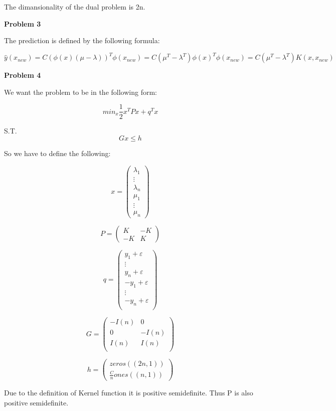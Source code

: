 \documentclass[12pt]{article}
\begin{document}
	The dimansionality of the dual problem is 2n.
	
	\textbf{Problem 3}
	
	\medskip
	
	The prediction is defined by the following formula:
	
	$$\hat{y}(x_{new}) = C(\phi(x)(\mu - \lambda))^T\phi(x_{new}) = C (\mu^T - \lambda^T)\phi(x)^T \phi(x_{new}) = C (\mu^T - \lambda^T) K(x, x_{new})$$
		
	\textbf{Problem 4}
	
	\medskip
	
	We want the problem to be in the following form:
	
	$$min_{x} \frac{1}{2} x^T P x + q^T x$$
	
	S.T. $$Gx \leq h$$
	
	So we have to define the following:
	
	$$x = \left( \begin{matrix}
				\lambda_{1}\\
				\vdots\\
				\lambda_n\\
				\mu_1\\
				\vdots\\
				\mu_n
			  \end{matrix} \right)$$
			  
	$$P = \left( \begin{matrix}
				K & -K \\
				-K & K
       	      \end{matrix} \right)$$
       	      
    $$q = \left( \begin{matrix}
			 y_1  + \varepsilon\\
			 \vdots\\
			 y_n + \varepsilon\\
			 -y_1  + \varepsilon\\
			 \vdots\\
			 -y_n + \varepsilon\\
	          \end{matrix} \right)$$
	          
	 $$G = \left( \begin{matrix}
				 -I(n) & 0 \\
				 0 & -I(n)\\
				 I(n) & I(n)\\
	            \end{matrix} \right)$$
	            
	 $$h = \left( \begin{matrix}
			 	zeros((2n, 1))\\
			 	\frac{C}{n} ones((n, 1))
	     	 	\end{matrix} \right)$$
	     	 	
	 Due to the definition of Kernel function it is positive semidefinite. Thus P is also positive semidefinite.  
\end{document}
